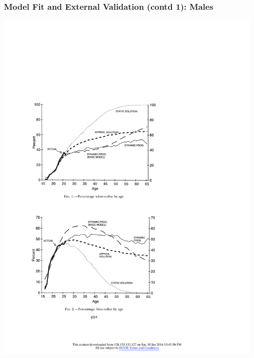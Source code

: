 \begin{frame}
	\frametitle{Model Fit and External Validation (contd 1): Males}
	\begin{center}
	\includegraphics[width=.9\textwidth]{tab-figs/figure1_1997}
	\end{center}
\end{frame}


